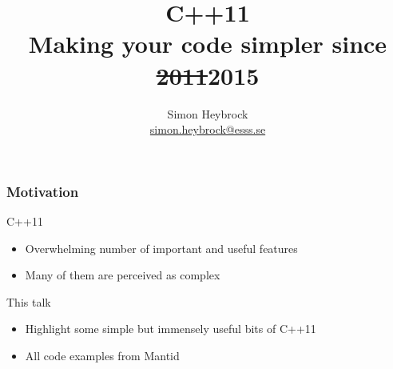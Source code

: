 \documentclass[english]{beamer}
\begin{document}
\title[C++11: Making your code simpler since 2011]{C++11\\Making your code simpler since \st{2011}2015}
\author[Simon Heybrock]{Simon Heybrock\\\footnotesize\url{simon.heybrock@esss.se}}

\date{}



\begin{frame}[plain]
    \titlepage
\end{frame}







\begin{frame}
    \frametitle{Motivation}
    \begin{block}{C++11}
    \begin{itemize}
        \item \alert{Overwhelming} number of important and useful features
        \item Many of them are perceived as \alert{complex}
    \end{itemize}
    \end{block}
    \begin{block}{This talk}
        \begin{itemize}
            \item Highlight some \alert{simple} but immensely \alert{useful} bits of C++11
            \item All code examples from Mantid
        \end{itemize}
    \end{block}
\end{frame}
\end{document}
